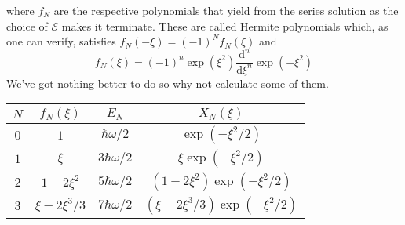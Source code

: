 where $f_N$ are the respective polynomials that yield from the series solution as the choice of $\mathcal E$ makes it terminate.
These are called Hermite polynomials which, as one can verify, satisfies $f_N(-\xi)=(-1)^Nf_N(\xi)$ and
$$f_N(\xi)=(-1)^n\exp(\xi^2)\frac{\mathrm d^n}{\mathrm d\xi^n}\exp(-\xi^2)$$
We've got nothing better to do so why not calculate some of them.
\begin{center}
    \begin{tabular}{c|c|c|c}
        $N$&$f_N(\xi)$&$E_N$&$X_N(\xi)$\\ \hline
        $0$&$1$&$\hbar\omega/2$&$\exp(-\xi^2/2)$\\
        $1$&$\xi$&$3\hbar\omega/2$&$\xi\exp(-\xi^2/2)$\\
        $2$&$1-2\xi^2$&$5\hbar\omega/2$&$(1-2\xi^2)\exp(-\xi^2/2)$\\
        $3$&$\xi-2\xi^3/3$&$7\hbar\omega/2$&$(\xi-2\xi^3/3)\exp(-\xi^2/2)$
    \end{tabular}
\end{center}